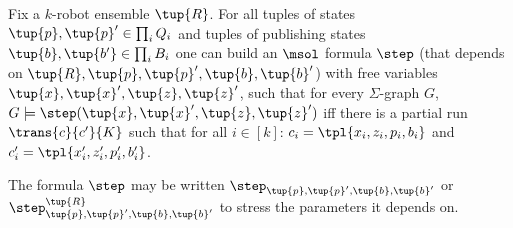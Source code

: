 \begin{lemma} \label{lem:onestep}
Fix a $k$-robot ensemble $\tup{R}$. For all tuples of states $\tup{p},\tup{p}' \in \prod_i Q_i$ and tuples of publishing states 
$\tup{b},\tup{b'} \in \prod_i B_i$
one can build an $\msol$ formula $\step$ (that depends on $\tup{R},\tup{p},\tup{p}',\tup{b},\tup{b}'$) with free variables 
$\tup{x}, \tup{x}', \tup{z},\tup{z}'$, such that for every $\Sigma$-graph $G$, 
$G \models \step(\tup{x}, \tup{x}', \tup{z},\tup{z}')$ iff there is a partial run $\trans{c}{c'}{K}$ such that
for all $i \in [k]$: $c_i = \tpl{x_i,z_i,p_i,b_i}$ and $c'_i = \tpl{x'_i,z'_i,p'_i,b'_i}$.

The formula $\step$ may be written $\step_{\tup{p},\tup{p}',\tup{b},\tup{b}'}$ or $\step^{\tup{R}}_{\tup{p},\tup{p}',\tup{b},\tup{b}'}$ to stress the parameters it depends on.
\end{lemma}


